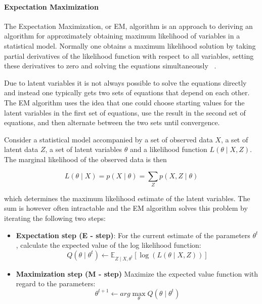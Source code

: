 \documentclass[12pt]{report}
\begin{document}
\paragraph{Expectation Maximization}

The Expectation Maximization, or EM, algorithm is an approach to deriving an
algorithm for approximately obtaining maximum likelihood of variables in a
statistical model. Normally one obtains a maximum likelihood solution by taking
partial derivatives of the likelihood function with respect to all variables,
setting these derivatives to zero and solving the equations simultaneously 
~\cite{Myung:2003}.

Due to latent variables it is not always possible to solve the equations
directly and instead one typically gets two sets of equations that depend on
each other. The EM algorithm uses the idea that one could choose starting
values for the latent variables in the first set of equations, use the result
in the second set of equations, and then alternate between the two sets until
convergence.

Consider a statistical model accompanied by a set of observed data $X$, a set of
latent data $Z$, a set of latent variables $\theta$ and a likelihood function
$L(\theta \mid X, Z)$. The marginal likelihood of the observed data is then

\begin{equation}
L(\theta \mid X) = p(X \mid \theta) = \sum\limits_{Z} p(X, Z \mid \theta)
\end{equation}

which determines the maximum likelihood estimate of the latent variables. The
sum is however often intractable and the EM algorithm solves this problem by
iterating the following two steps:

\begin{itemize}
\item \textbf{Expectation step (E - step)}: For the current estimate of the 
parameters $\theta^t$, calculate the expected value of the log likelihood function:
\begin{equation}
Q(\theta \mid \theta^t) \leftarrow \mathbb{E}_{Z \mid X, \theta^t}
 [\log(L(\theta \mid X, Z))]
\end{equation}
\item \textbf{Maximization step (M - step)} Maximize the expected value function 
with regard to the parameters:
\begin{equation}
\theta^{t + 1} \leftarrow arg \max\limits_{\theta} Q(\theta \mid \theta^t)
\end{equation}
\end{itemize}
\end{document}
